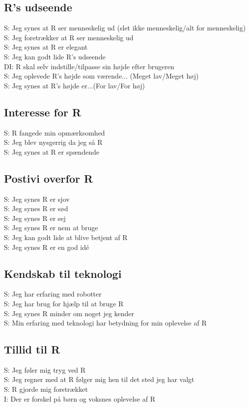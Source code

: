 \subsection{R's udseende}
%
S: Jeg synes at R ser menneskelig ud (slet ikke menneskelig/alt for menneskelig)\\
S: Jeg foretrækker at R ser menneskelig ud\\
S: Jeg synes at R er elegant\\
S: Jeg kan godt lide R's udseende\\
DI: R skal selv indstille/tilpasse sin højde efter brugeren\\
S: Jeg oplevede R's højde som værende... (Meget lav/Meget høj)\\
S: Jeg synes at R's højde er...(For lav/For høj)\\

\subsection{Interesse for R}
%
S: R fangede min opmærksomhed\\
S: Jeg blev nysgerrig da jeg så R\\
S: Jeg synes at R er spændende\\


\subsection{Postivi overfor R}
%
S: Jeg synes R er sjov\\
S: Jeg synes R er sød\\
S: Jeg synes R er sej\\
S: Jeg synes R er nem at bruge\\
S: Jeg kan godt lide at blive betjent af R\\
S: Jeg synes R er en god idé

\subsection{Kendskab til teknologi}
%
S: Jeg har erfaring med robotter\\
S: Jeg har brug for hjælp til at bruge R\\
S: Jeg synes R minder om noget jeg kender\\
S: Min erfaring med teknologi har betydning for min oplevelse af R

\subsection{Tillid til R}
%
S: Jeg føler mig tryg ved R\\
S: Jeg regner med at R følger mig hen til det sted jeg har valgt\\
S: R gjorde mig forstrækket\\
I: Der er forskel på børn og voksnes oplevelse af R







